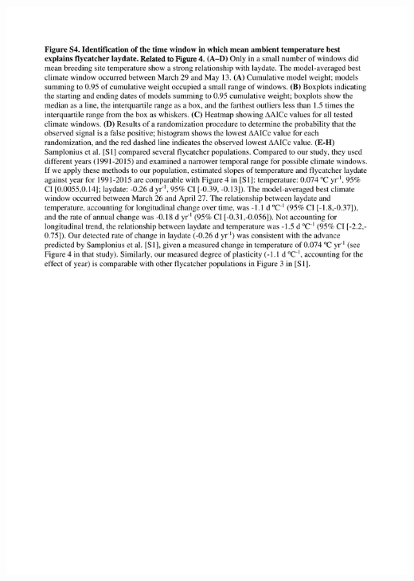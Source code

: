 \documentclass[a4paper, twoside]{templates/ociamthesis}
\begin{document}
\includegraphics[width=1\linewidth]{pdf_chapters/pied/pied_supp_crop_Part6}
\end{document}
